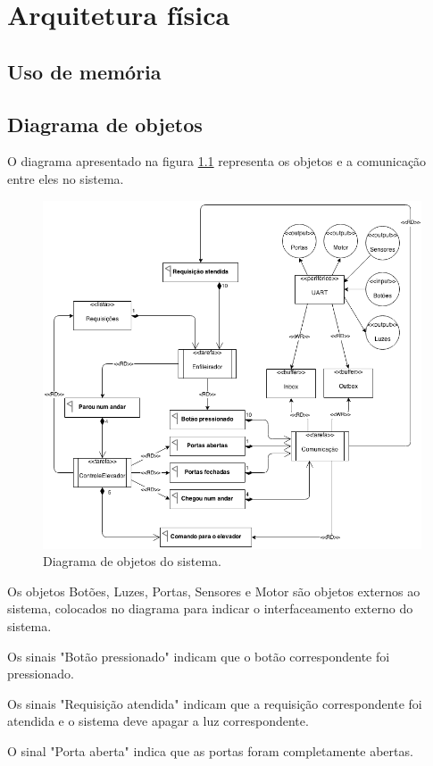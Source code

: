\chapter{Arquitetura física}


\section{Uso de memória}


\section{Diagrama de objetos}

O diagrama apresentado na figura \ref{fig:objetos} representa os objetos e a comunicação entre eles no sistema.

\begin{figure}[h]
    \centering
    \includegraphics[width=0.8\columnwidth]{./figures/Objetos.png}
    \caption{Diagrama de objetos do sistema.}
    \label{fig:objetos}
\end{figure}

Os objetos Botões, Luzes, Portas, Sensores e Motor são objetos externos ao sistema, colocados no diagrama para indicar o interfaceamento externo do sistema.

Os sinais "Botão pressionado" indicam que o botão correspondente foi pressionado.

Os sinais "Requisição atendida" indicam que a requisição correspondente foi atendida e o sistema deve apagar a luz correspondente.

O sinal "Porta aberta" indica que as portas foram completamente abertas.

